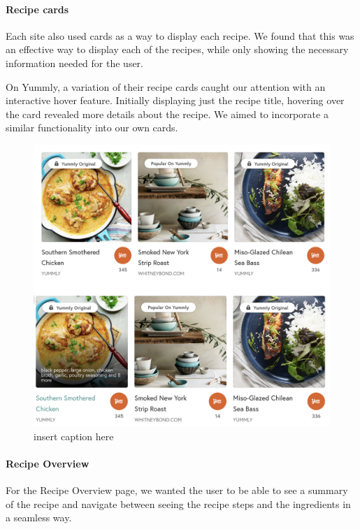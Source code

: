 \documentclass{article}
\begin{document}
    \paragraph{Recipe cards}
    Each site also used cards as a way to display each recipe. We found that this was an effective way to display each of the recipes, while only showing the necessary information needed for the user.
    
    On Yummly, a variation of their recipe cards caught our attention with an interactive hover feature. Initially displaying just the recipe title, hovering over the card revealed more details about the recipe. We aimed to incorporate a similar functionality into our own cards.
    
    \begin{figure}[htbp]
      \includegraphics[width=1.0\textwidth]{Yummly recipe cards.png}
      \centering
      \caption{insert caption here}
    \end{figure}

    \paragraph{Recipe Overview}
    For the Recipe Overview page, we wanted the user to be able to see a summary of the recipe and navigate between seeing the recipe steps and the ingredients in a seamless way.
    
\end{document}
